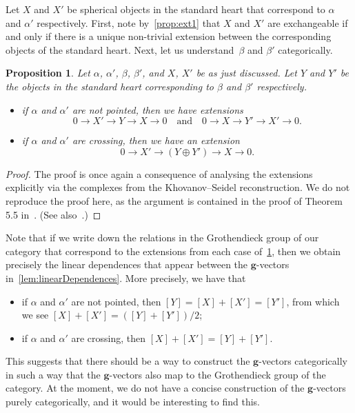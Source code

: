 \documentclass{amsart}
\newtheorem{proposition}[theorem]{Proposition}
\theoremstyle{definition}
\renewcommand{\b}[1]{{\boldsymbol{#1}}} %
\begin{document}
Let \(X\) and \(X'\) be spherical objects in the standard heart that correspond to \(\alpha\) and \(\alpha'\) respectively.
First, note by~\cref{prop:ext1} that \(X\) and \(X'\) are exchangeable if and only if there is a unique non-trivial extension between the corresponding objects of the standard heart.
Next, let us understand~\(\beta\) and \(\beta'\) categorically.
\begin{proposition}\label{prop:extensions}
  Let \(\alpha\), \(\alpha'\), \(\beta\), \(\beta'\), and \(X\), \(X'\) be as just discussed.
  Let \(Y\) and \(Y'\) be the objects in the standard heart corresponding to \(\beta\) and \(\beta'\) respectively.
\begin{itemize}
\item if \(\alpha\) and \(\alpha'\) are not pointed, then we have extensions
  \[0 \to X' \to Y \to X \to 0 \quad \text{and}\quad 0 \to X \to Y' \to X' \to 0.\]
\item if \(\alpha\) and \(\alpha'\) are crossing, then we have an extension
  \[0 \to X' \to (Y \oplus Y') \to X \to 0.\]
\end{itemize}
\end{proposition}
\begin{proof}
  The proof is once again a consequence of analysing the extensions explicitly via the complexes from the Khovanov--Seidel reconstruction.
  We do not reproduce the proof here, as the argument is contained in the proof of Theorem 5.5 in~\cite{tho:06}.
  (See also~\cite[Figure 4]{tho:06}.)
\end{proof}
Note that if we write down the relations in the Grothendieck group of our category that correspond to the extensions from each case of~\cref{prop:extensions}, then we obtain precisely the linear dependences that appear between the \(\b{g}\)-vectors in~\cref{lem:linearDependences}.
More precisely, we have that
\begin{itemize}
\item if \(\alpha\) and \(\alpha'\) are not pointed, then
  \([Y] = [X] + [X'] = [Y']\),
  from which we see \([X] + [X'] = ([Y] + [Y'])/2\);
\item if \(\alpha\) and \(\alpha'\) are crossing, then
  \([X] + [X'] = [Y] + [Y'].\)
\end{itemize}
This suggests that there should be a way to construct the \(\b{g}\)-vectors categorically in such a way that the \(\b{g}\)-vectors also map to the Grothendieck group of the category.
At the moment, we do not have a concise construction of the \(\b{g}\)-vectors purely categorically, and it would be interesting to find this.
\end{document}
